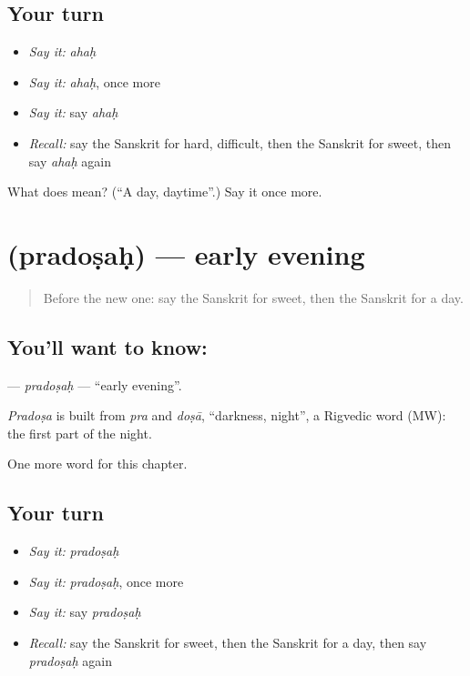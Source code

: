 \subsection*{Your turn}
\begin{itemize}
\raggedright
  \item \emph{Say it:} \emph{ahaḥ}
  \item \emph{Say it:} \emph{ahaḥ}, once more
  \item \emph{Say it:} say \emph{ahaḥ}
  \item \emph{Recall:} say the Sanskrit for hard, difficult, then the Sanskrit for sweet, then say \emph{ahaḥ} again
\end{itemize}

\begin{tcolorbox}[breakable,colback=teal!4,colframe=teal!35!black,title={Before you move on}]
What does  mean? (\textquotedblleft{}A day, daytime\textquotedblright{}.) Say it once more.
\end{tcolorbox}
\section[\texorpdfstring{\sk{प्रदोषः} (pradoṣaḥ)}{प्रदोषः (pradoṣaḥ)}]{ (pradoṣaḥ) — early evening}

\label{lesson:SA-C90-pradosah}



\begin{quote}
Before the new one: say the Sanskrit for sweet, then the Sanskrit for a day.
\end{quote}

\subsection*{You'll want to know: }
\textbf{} — \emph{pradoṣaḥ} — \textquotedblleft{}early evening\textquotedblright{}.

\begin{cousinweb}
\emph{Pradoṣa} is built from \emph{pra} and \emph{doṣā}, \textquotedblleft{}darkness, night\textquotedblright{}, a Rigvedic word (MW): the first part of the night.
\end{cousinweb}

\begin{grammarlens}[title={What you've built}]
One more word for this chapter.
\end{grammarlens}

\subsection*{Your turn}
\begin{itemize}
\raggedright
  \item \emph{Say it:} \emph{pradoṣaḥ}
  \item \emph{Say it:} \emph{pradoṣaḥ}, once more
  \item \emph{Say it:} say \emph{pradoṣaḥ}
  \item \emph{Recall:} say the Sanskrit for sweet, then the Sanskrit for a day, then say \emph{pradoṣaḥ} again
\end{itemize}

